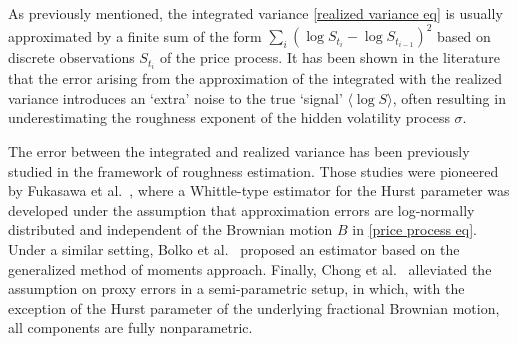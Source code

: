 \documentclass[12pt,reqno]{article}
\numberwithin{equation}{section}
\theoremstyle{definition}
\def\<{\langle}
\def\>{\rangle}
\begin{document}
As previously mentioned, the integrated variance \eqref{realized variance eq} is usually approximated by a finite sum of the form $\sum_i(\log S_{t_i}-\log S_{t_{i-1}})^2$ based on discrete observations $ S_{t_i}$ of the price process. It has been shown in the literature \cite{BolkoPakkanen2022GMM, Fukasawa2022Estimation} that the error arising from the approximation of the integrated with the realized variance introduces an \lq extra' noise to the true \lq signal' $\<\log S\>$, often resulting in underestimating the roughness exponent of the hidden volatility process $\sigma$. 

The error between the integrated and realized variance has been previously studied in the framework of roughness estimation. Those studies were pioneered by Fukasawa et al.~\cite{Fukasawa2022Estimation}, where a Whittle-type estimator for the Hurst parameter was developed under the assumption that approximation errors are log-normally distributed and independent of the Brownian motion $B$ in \eqref{price process eq}. Under a similar setting, Bolko et al.~\cite{BolkoPakkanen2022GMM} proposed an estimator based on the generalized method of moments approach. Finally, Chong et al.~\cite{Chong2022CLT, Chong2022Minimax} alleviated the assumption on proxy errors in a semi-parametric setup, in which,   with the exception of the Hurst parameter of the underlying fractional Brownian motion, all components are fully nonparametric. 
\end{document}
